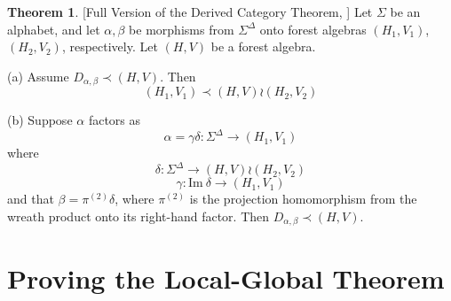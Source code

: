\documentclass[sigplan,9pt]{acmart}\settopmatter{printfolios=true,printccs=false,printacmref=false}
\newcounter{thm}
\newcounter{theorem}
\theoremstyle{definition}
\newtheorem{theorem}[thm]{Theorem}
\begin{document}
\begin{theorem}\label{thm:full:deriv}[Full Version of the Derived Category Theorem, \cite{straubing-forest-2018}]
Let $\Sigma$ be an alphabet, and let $\alpha, \beta$ be morphisms from $\Sigma^\Delta$ onto forest algebras $(H_1, V_1)$, $(H_2, V_2)$, respectively. Let $(H,V)$ be a forest algebra.

(a) Assume $D_{\alpha, \beta} \prec (H,V)$. Then
$$(H_1,V_1) \prec (H,V) \wr (H_2, V_2)$$

(b) Suppose $\alpha$ factors as
$$\alpha = \gamma\delta : \Sigma^\Delta \rightarrow (H_1, V_1)$$
where
$$\delta : \Sigma^\Delta \rightarrow (H,V) \wr (H_2,V_2)$$
$$\gamma : \text{Im}\ \delta \rightarrow (H_1,V_1)$$
and that $\beta = \pi^{(2)}\delta$, where $\pi^{(2)}$ is the projection homomorphism from the wreath product onto its right-hand factor. Then $D_{\alpha,\beta} \prec (H,V)$.
\end{theorem}





\newpage
\section{Proving the Local-Global Theorem}\label{sec:locglob}
\end{document}

